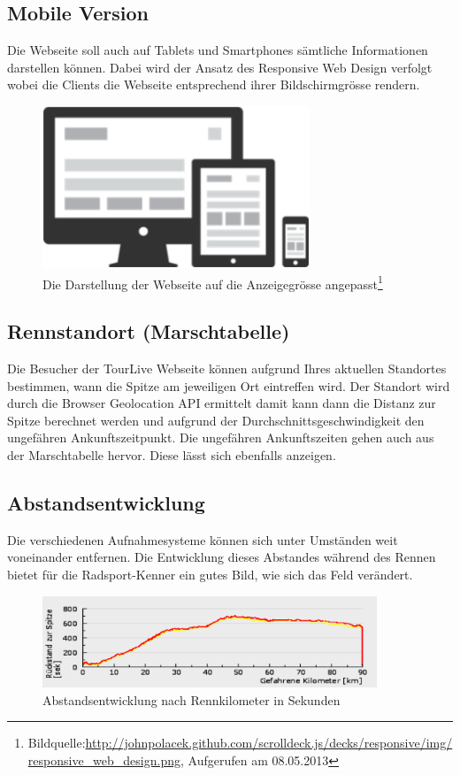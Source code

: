 \subsection{Mobile Version}
Die Webseite soll auch auf Tablets und Smartphones sämtliche Informationen darstellen können. Dabei wird der Ansatz des Responsive Web Design verfolgt wobei die Clients die Webseite entsprechend ihrer Bildschirmgrösse rendern.
\begin{figure}[H]
	\centering 
	\includegraphics[width=80mm]{images/responsive.png}
	\caption{Die Darstellung der Webseite auf die Anzeigegrösse angepasst\footnote{Bildquelle:\url{http://johnpolacek.github.com/scrolldeck.js/decks/responsive/img/responsive_web_design.png}, Aufgerufen am 08.05.2013}}
\end{figure}
\subsection{Rennstandort (Marschtabelle)}
Die Besucher der TourLive Webseite können aufgrund Ihres aktuellen Standortes bestimmen, wann die Spitze am jeweiligen Ort eintreffen wird. Der Standort wird durch die Browser Geolocation API ermittelt damit kann dann die Distanz zur Spitze berechnet werden und aufgrund der Durchschnittsgeschwindigkeit den ungefähren Ankunftszeitpunkt.
Die ungefähren Ankunftszeiten gehen auch aus der Marschtabelle hervor. Diese lässt sich ebenfalls anzeigen.

\subsection{Abstandsentwicklung}
Die verschiedenen Aufnahmesysteme können sich unter Umständen weit voneinander entfernen. Die Entwicklung dieses Abstandes während des Rennen bietet für die Radsport-Kenner ein gutes Bild, wie sich das Feld verändert.
\begin{figure}[H]
	\centering
	\includegraphics[width=100mm]{images/abstandsentwicklung.png}
	\caption{Abstandsentwicklung nach Rennkilometer in Sekunden}
\end{figure}

